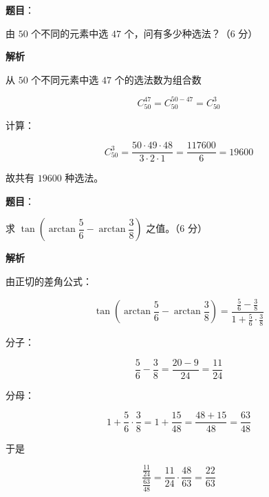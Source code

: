 \begin{answer}

\textbf{题目}：

由 $50$ 个不同的元素中选 $47$ 个，问有多少种选法？（6 分）

\textbf{解析}

从 $50$ 个不同元素中选 $47$ 个的选法数为组合数

\nopagebreak[4]
\[
C_{50}^{47}=C_{50}^{50-47}=C_{50}^{3}
\]

计算：

\nopagebreak[4]
\[
C_{50}^{3}=\frac{50\cdot 49\cdot 48}{3\cdot 2\cdot 1}=\frac{117600}{6}=19600
\]

故共有 $19600$ 种选法。


\end{answer}
\begin{answer}

\textbf{题目}：

求 $\tan\left(\arctan\dfrac{5}{6}-\arctan\dfrac{3}{8}\right)$ 之值。（6 分）

\textbf{解析}

由正切的差角公式：

\nopagebreak[4]
\[
\tan\left(\arctan\frac{5}{6}-\arctan\frac{3}{8}\right)
=\frac{\frac{5}{6}-\frac{3}{8}}{1+\frac{5}{6}\cdot\frac{3}{8}}
\]

分子：

\nopagebreak[4]
\[
\frac{5}{6}-\frac{3}{8}=\frac{20-9}{24}=\frac{11}{24}
\]

分母：

\nopagebreak[4]
\[
1+\frac{5}{6}\cdot\frac{3}{8}=1+\frac{15}{48}=\frac{48+15}{48}=\frac{63}{48}
\]

于是

\nopagebreak[4]
\[
\frac{\frac{11}{24}}{\frac{63}{48}}=\frac{11}{24}\cdot\frac{48}{63}=\frac{22}{63}
\]


\end{answer}
